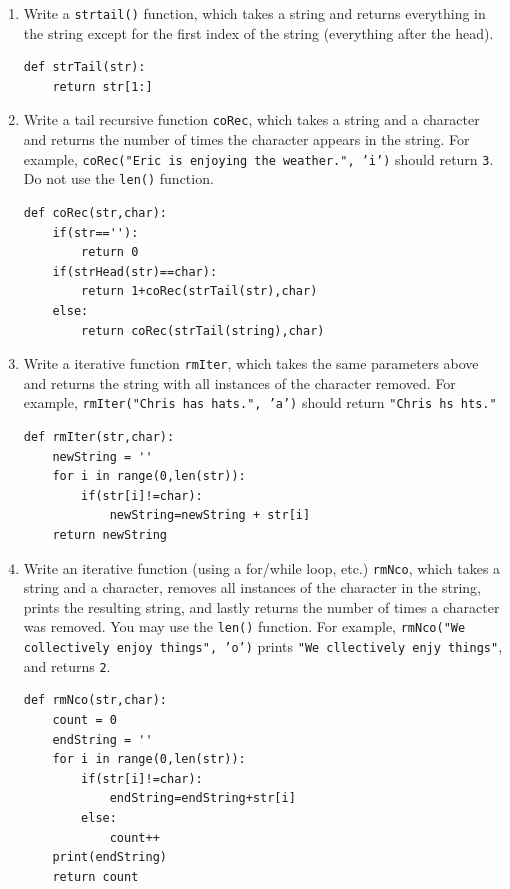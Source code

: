 \documentclass[11pt]{article}
\newenvironment{answer}{\large\lstset{basicstyle=\large}\color{white}}{}
\newenvironment{answer}{\large\lstset{basicstyle=\large}\color{red}}{}
\begin{document}
\begin{enumerate}
\begin{enumerate}
\item
Write a \texttt{strtail()} function, which takes a string and returns everything in the string except for the first index of the string (everything after the head).
\begin{answer}
\begin{lstlisting}
def strTail(str):
    return str[1:]
\end{lstlisting}
\end{answer}

\item
\label{tailrecursive}
Write a tail recursive function \texttt{coRec}, which takes a string and a character and returns the number of times the character appears in the string.
For example, \texttt{coRec("Eric is enjoying the weather.", 'i')} should return \texttt{3}.
Do not use the \texttt{len()} function.
\begin{answer}
\begin{lstlisting}
def coRec(str,char):
    if(str==''):
        return 0
    if(strHead(str)==char):
        return 1+coRec(strTail(str),char)
    else:
        return coRec(strTail(string),char)
\end{lstlisting}
\end{answer}

\item
\label{iterative}
Write a iterative function \texttt{rmIter}, which takes the same parameters above and returns the string with all instances of the character removed.
For example, \texttt{rmIter("Chris has hats.", 'a')} should return \texttt{"Chris hs hts."}
\begin{answer}
\begin{lstlisting}
def rmIter(str,char):
    newString = ''
    for i in range(0,len(str)):
        if(str[i]!=char):
            newString=newString + str[i]
    return newString
\end{lstlisting}
\end{answer}


\newpage


\item
\label{iternum}
Write an iterative function (using a for/while loop, etc.) \texttt{rmNco}, which takes a string and a character, removes all instances of the character in the string, prints the resulting string, and lastly returns the number of times a character was removed.
You may use the \texttt{len()} function.
For example, \texttt{rmNco("We collectively enjoy things", 'o')} prints \texttt{"We cllectively enjy things"}, and returns \texttt{2}.
\begin{answer}
\begin{lstlisting}
def rmNco(str,char):
    count = 0
    endString = ''
    for i in range(0,len(str)):
        if(str[i]!=char):
            endString=endString+str[i]
        else:
            count++
    print(endString)
    return count
\end{lstlisting}
\end{answer}


\end{enumerate}
\end{enumerate}
\end{document}

